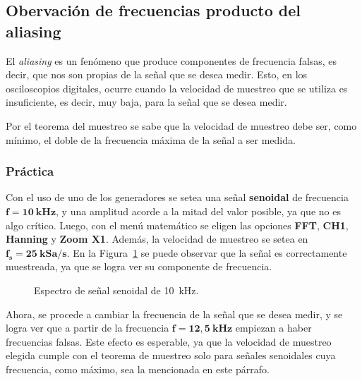   \pagebreak
  \subsection{Obervación de frecuencias producto del aliasing}
    El \textit{aliasing} es un fenómeno que produce componentes de frecuencia falsas, es decir,
    que nos son propias de la señal que se desea medir. Esto, en los osciloscopios digitales,
    ocurre cuando la velocidad de muestreo que se utiliza es insuficiente, es decir, muy baja,
    para la señal que se desea medir.
    
    Por el teorema del muestreo se sabe que la velocidad de muestreo debe ser, como mínimo, el
    doble de la frecuencia máxima de la señal a ser medida.

    \subsubsection{Práctica}
      Con el uso de uno de los generadores se setea una señal \textbf{senoidal} de frecuencia
      $\mathbf{f = 10~kHz}$, y una amplitud acorde a la mitad del valor posible, ya que no es
      algo crítico. Luego, con el menú matemático se eligen las opciones \textbf{FFT}, \textbf{CH1},
      \textbf{Hanning} y \textbf{Zoom X1}. Además, la velocidad de muestreo se setea en 
      $\mathbf{f_s = 25~kSa/s}$. En la Figura~\ref{fig:Exp3Señal10k} se puede observar que la señal 
      es correctamente muestreada, ya que se logra ver su componente de frecuencia.
      
      \begin{figure}[H]
        \centering
        \caption{Espectro de señal senoidal de 10~kHz.}
        \label{fig:Exp3Señal10k}
      \end{figure}
      
      Ahora, se procede a cambiar la frecuencia de la señal que se desea medir, y se logra ver que
      a partir de la frecuencia $\mathbf{f = 12,5~kHz}$ empiezan a haber frecuencias falsas. Este
      efecto es esperable, ya que la velocidad de muestreo elegida cumple con el teorema de muestreo
      solo para señales senoidales cuya frecuencia, como máximo, sea la mencionada en este párrafo.

